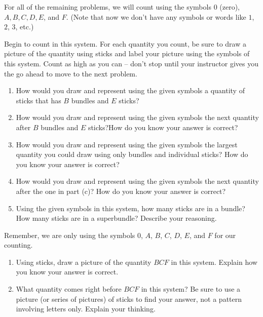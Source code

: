 \documentclass{ximera}
\begin{document}
\newpage

For all of the remaining problems, we will count using the symbols $0$ (zero), $A, B, C, D, E$, and $F$. (Note that now we don't have any symbols or words like $1$, $2$, $3$, etc.)

\begin{problem}

Begin to count in this system. For each quantity you count, be sure to draw a picture of the quantity using sticks and label your picture using the symbols of this system. Count as high as you can -- don't stop until your instructor gives you the go ahead to move to the next problem. 

\end{problem}


\begin{problem}
\begin{enumerate}
	\item How would you draw and represent using the given symbols a quantity of sticks that has $B$ bundles and $E$ sticks?
	\item How would you draw and represent using the given symbols the next quantity after $B$ bundles and $E$ sticks?How do you know your answer is correct?
	\item How would you draw and represent using the given symbols the largest quantity you could draw using only bundles and individual sticks? How do you know your answer is correct?
	\item How would you draw and represent using the given symbols the next quantity after the one in part (c)? How do you know your answer is correct?
	\item Using the given symbols in this system, how many sticks are in a bundle? How many sticks are in a superbundle? Describe your reasoning. 
\end{enumerate}
\end{problem}

\newpage

Remember, we are only using the symbols $0$, $A$, $B$, $C$, $D$, $E$, and $F$ for our counting.

\begin{problem}
\begin{enumerate}
	\item Using sticks, draw a picture of the quantity $BCF$ in this system. Explain how you know your answer is correct.
	\item What quantity comes right before $BCF$ in this system? Be sure to use a picture (or series of pictures) of sticks to find your answer, not a pattern involving letters only. Explain your thinking.
\end{enumerate}
\end{problem}
\end{document}
